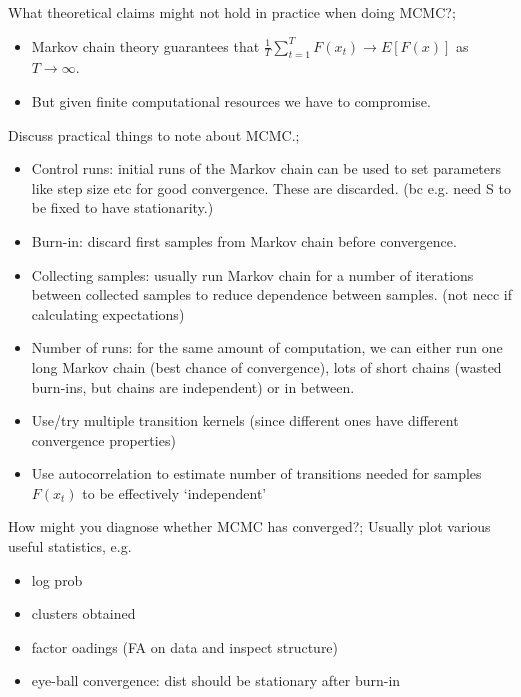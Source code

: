 \documentclass{article}
\begin{document}
What theoretical claims might not hold in practice when doing MCMC?; \begin{itemize} \item Markov chain theory guarantees that $\frac{1}{T}\sum_{t=1}^T F(x_t)\rightarrow E[F(x)]$ as $T\rightarrow \infty$. \item But given finite computational resources we have to compromise. \end{itemize}

Discuss practical things to note about MCMC.; \begin{itemize} \item Control runs: initial runs of the Markov chain can be used to set parameters like step size etc for good convergence. These are discarded. (bc e.g. need S to be fixed to have stationarity.) \item Burn-in: discard first samples from Markov chain before convergence. \item Collecting samples: usually run Markov chain for a number of iterations between collected samples to reduce dependence between samples. (not necc if calculating expectations) \item Number of runs: for the same amount of computation, we can either run one long Markov chain (best chance of convergence), lots of short chains (wasted burn-ins, but chains are independent) or in between. \item Use/try multiple transition kernels (since different ones have different convergence properties) \item Use autocorrelation to estimate number of transitions needed for samples $F(x_t)$ to be effectively `independent' \end{itemize}

How might you diagnose whether MCMC has converged?; Usually plot various useful statistics, e.g. \begin{itemize} \item log prob \item clusters obtained \item factor oadings (FA on data and inspect structure) \item eye-ball convergence: dist should be stationary after burn-in \end{itemize}
\end{document}

